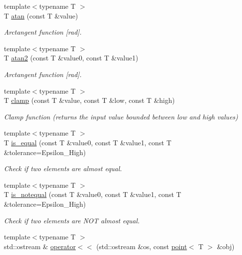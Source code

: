 \begin{DoxyCompactItemize}
{\footnotesize template$<$typename T $>$ }\\T \hyperlink{namespaceddd_a750f7cad6893bbbfbaa51353044bde4f}{atan} (const T \&value)
\begin{DoxyCompactList}\small\item\em Arctangent function \mbox{[}rad\mbox{]}. \end{DoxyCompactList}\item 
{\footnotesize template$<$typename T $>$ }\\T \hyperlink{namespaceddd_a1dea631509d981c3718796774b796d6c}{atan2} (const T \&value0, const T \&value1)
\begin{DoxyCompactList}\small\item\em Arctangent function \mbox{[}rad\mbox{]}. \end{DoxyCompactList}\item 
{\footnotesize template$<$typename T $>$ }\\T \hyperlink{namespaceddd_a070060e53a22cb16f07576bfb5c4b1cc}{clamp} (const T \&value, const T \&low, const T \&high)
\begin{DoxyCompactList}\small\item\em Clamp function (returns the input value bounded between low and high values) \end{DoxyCompactList}\item 
{\footnotesize template$<$typename T $>$ }\\T \hyperlink{namespaceddd_a7d68733d32a94776596a8e213ae9fcdf}{is\+\_\+equal} (const T \&value0, const T \&value1, const T \&tolerance=Epsilon\+\_\+\+High)
\begin{DoxyCompactList}\small\item\em Check if two elements are almost equal. \end{DoxyCompactList}\item 
{\footnotesize template$<$typename T $>$ }\\T \hyperlink{namespaceddd_a9b12e82fa10b6beadb08360007e6b57b}{is\+\_\+notequal} (const T \&value0, const T \&value1, const T \&tolerance=Epsilon\+\_\+\+High)
\begin{DoxyCompactList}\small\item\em Check if two elements are N\+OT almost equal. \end{DoxyCompactList}\item 
{\footnotesize template$<$typename T $>$ }\\std\+::ostream \& \hyperlink{namespaceddd_a02d73e2ba5a018e4e525deb8aea3c0a8}{operator$<$$<$} (std\+::ostream \&os, const \hyperlink{classddd_1_1point}{point}$<$ T $>$ \&obj)

\end{DoxyCompactItemize}
